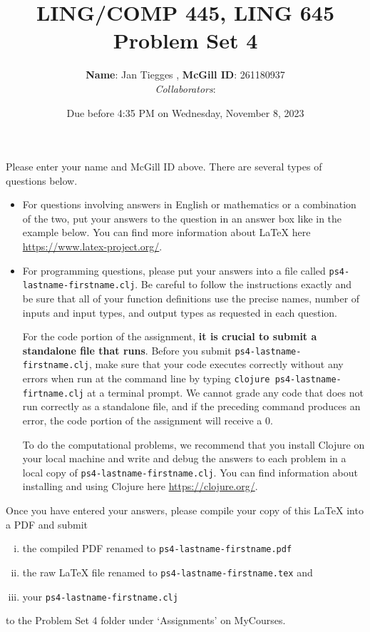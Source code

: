\documentclass[10pt]{article}
\author{
  \textbf{Name}: Jan Tiegges       %
, \textbf{McGill ID}: 261180937 %
\\ \textit{Collaborators}:  %
}
\newcommand{\PSnum}{4}
\begin{document}
\title{LING/COMP 445, LING 645\\Problem Set \PSnum}
\date{Due before 4:35 PM on Wednesday, November 8, 2023}
\maketitle
Please enter your name and McGill ID above.
There are several types of questions below. 
\begin{itemize}
\item
For questions involving answers in English or mathematics or a
combination of the two, put your answers to the question in an
answer box like in the example below. You can find more
information about \LaTeX{} here \url{https://www.latex-project.org/}.

\item For programming questions,
please put your answers into a file called
\texttt{ps\PSnum-lastname-firstname.clj}. Be careful to follow the instructions
exactly and be sure that all of your function definitions use the
precise names, number of inputs and input types, and output types as
requested in each question.

For the code portion of the assignment, \textbf{it is crucial to submit a
standalone file that runs}. Before you submit \texttt{ps\PSnum-lastname-firstname.clj}, 
make sure that your code executes correctly without any errors 
when run at the command line by typing 
\texttt{clojure ps\PSnum-lastname-firtname.clj} at a terminal
prompt. We cannot grade any code that does not run correctly as a
standalone file, and if the preceding command produces an error,
the code portion of the assignment will receive a $0$.

To do the computational problems, we recommend that you install
Clojure on your local machine and write and debug the answers to each
problem in a local copy of \texttt{ps\PSnum-lastname-firstname.clj}. You can
find information about installing and using Clojure here
\url{https://clojure.org/}.
\end{itemize}
Once you have entered your answers, please compile your copy of this
\LaTeX{} into a PDF and submit 
\begin{enumerate}[(i),noitemsep]
\item
the compiled PDF renamed to
\texttt{ps\PSnum-lastname-firstname.pdf} 
\item
the raw \LaTeX{} file renamed to
\texttt{ps\PSnum-lastname-firstname.tex} and 
\item
your \texttt{ps\PSnum-lastname-firstname.clj}
\end{enumerate}
to the Problem Set \PSnum{} folder under `Assignments' on MyCourses.
\end{document}
